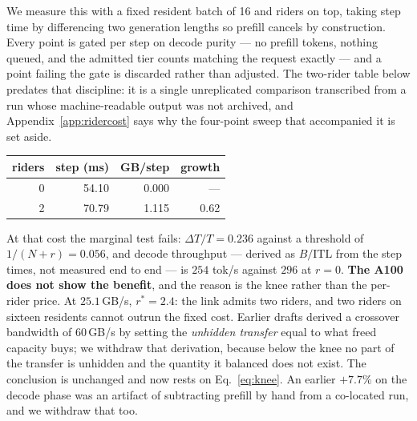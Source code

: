 We measure this with a fixed resident batch of 16 and riders on top, taking step time
by differencing two generation lengths so prefill cancels by construction. Every
point is gated per step on decode purity --- no prefill tokens, nothing queued, and
the admitted tier counts matching the request exactly --- and a point failing the
gate is discarded rather than adjusted. The two-rider table below predates that
discipline: it is a single unreplicated comparison transcribed from a run whose
machine-readable output was not archived, and Appendix~\ref{app:ridercost} says why
the four-point sweep that accompanied it is set aside.
%
\begin{center}\small
\begin{tabular}{rrrr}
\toprule
riders & step (ms) & GB/step & growth \\
\midrule
0 & 54.10 & 0.000 & --- \\
2 & 70.79 & 1.115 & 0.62 \\
\bottomrule
\end{tabular}
\end{center}
%
At that cost the marginal test fails: $\Delta T/T = 0.236$ against a threshold
of $1/(N{+}r) = 0.056$, and decode throughput --- derived as $B/\mathrm{ITL}$
from the step times, not measured end to end --- is $254$ tok/s against $296$ at
$r{=}0$. \textbf{The A100 does not show the benefit}, and the reason is the knee
rather than the per-rider price. At $25.1$\,GB/s, $r^{*} = 2.4$: the link admits two
riders, and two riders on sixteen residents cannot outrun the fixed cost. Earlier
drafts derived a crossover bandwidth of $60$\,GB/s by setting the \emph{unhidden
transfer} equal to what freed capacity buys; we withdraw that derivation, because
below the knee no part of the transfer is unhidden and the quantity it balanced does
not exist. The conclusion is unchanged and now rests on Eq.~\ref{eq:knee}. An
earlier $+7.7\%$ on the decode phase was an artifact of subtracting prefill by hand
from a co-located run, and we withdraw that too.


